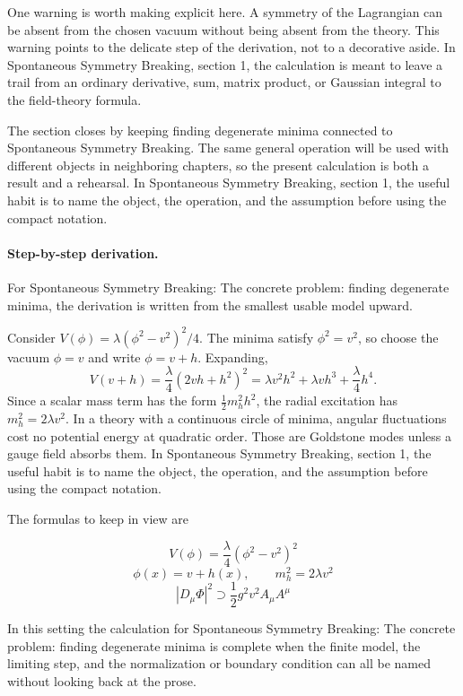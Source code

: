 One warning is worth making explicit here.  A symmetry of the Lagrangian can be absent from the chosen vacuum without being absent from the theory.  This warning points to the delicate step of the derivation, not to a decorative aside.  In Spontaneous Symmetry Breaking, section 1, the calculation is meant to leave a trail from an ordinary derivative, sum, matrix product, or Gaussian integral to the field-theory formula.

The section closes by keeping finding degenerate minima connected to Spontaneous Symmetry Breaking.  The same general operation will be used with different objects in neighboring chapters, so the present calculation is both a result and a rehearsal.  In Spontaneous Symmetry Breaking, section 1, the useful habit is to name the object, the operation, and the assumption before using the compact notation.



\paragraph{Step-by-step derivation.}

For Spontaneous Symmetry Breaking: The concrete problem: finding degenerate minima, the derivation is written from the smallest usable model upward.

Consider \(V(\phi)=\lambda(\phi^2-v^2)^2/4\).  The minima satisfy \(\phi^2=v^2\), so choose the vacuum \(\phi=v\) and write \(\phi=v+h\).  Expanding,
\[
  V(v+h)=\frac{\lambda}{4}(2vh+h^2)^2
  =\lambda v^2h^2+\lambda vh^3+\frac{\lambda}{4}h^4.
\]
Since a scalar mass term has the form \(\frac12m_h^2h^2\), the radial excitation has \(m_h^2=2\lambda v^2\).  In a theory with a continuous circle of minima, angular fluctuations cost no potential energy at quadratic order.  Those are Goldstone modes unless a gauge field absorbs them.  In Spontaneous Symmetry Breaking, section 1, the useful habit is to name the object, the operation, and the assumption before using the compact notation.

The formulas to keep in view are

\[
  V(\phi)=\frac{\lambda}{4}(\phi^2-v^2)^2
\]
\[
  \phi(x)=v+h(x),\qquad m_h^2=2\lambda v^2
\]
\[
  |D_\mu\Phi|^2\supset \frac12g^2v^2A_\mu A^\mu
\]

In this setting the calculation for Spontaneous Symmetry Breaking: The concrete problem: finding degenerate minima is complete when the finite model, the limiting step, and the normalization or boundary condition can all be named without looking back at the prose.




